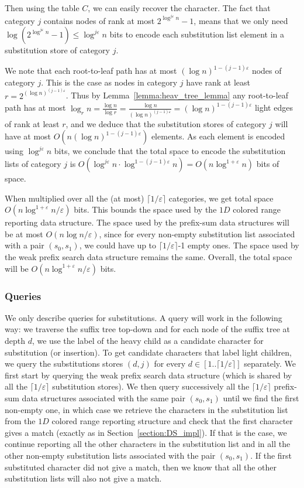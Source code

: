 \documentclass{article}
\newcommand{\?}{\mskip1.5mu}
\renewcommand{\epsilon}{\varepsilon}
\begin{document}
Then using the table $C$, we can easily recover the character. The fact that category $j$ contains nodes of rank at most $2^{\log^{j\epsilon} n}-1$, means that we only need $\log (2^{\log^{j\epsilon} n}-1)\leq \log^{j\epsilon} n$ bits to encode each substitution list element in a substitution store of category $j$. 

We note that each root-to-leaf path has at most $(\log n)^{1-(j-1)\epsilon}$ nodes of category $j$. This is the case as nodes in category $j$ have rank at least $r=2^{(\log n)^{(j-1)\epsilon}}$. Thus by Lemma~\ref{lemma:heav_tree_lemma} any root-to-leaf path has at most $\log_r n=\frac{\log n}{\log r}=\frac{\log n}{(\log n)^{(j-1)\epsilon}}=(\log n)^{1-(j-1)\epsilon}$ light edges of rank at least $r$, and we deduce that the substitution stores of category $j$ will have at most $O(n(\log n)^{1-(j-1)\epsilon})$ elements. As each element is encoded using $\log^{j\epsilon} n$ bits, we conclude that the total space to encode the substitution lists of category $j$ is $O(\log^{j\epsilon} n\cdot \log^{1-(j-1)\epsilon}n)=O(n\log^{1+\epsilon}n)$ bits of space.

When multiplied over all the (at most) $\lceil1/\epsilon\rceil$ categories, we get total space $O(n\log^{1+\epsilon}n/\epsilon)$ bits.
This bounds the space used by the $1D$ colored range reporting data structure. The space used by the prefix-sum data structures will be at most $O(n\log n/\epsilon)$, since for every non-empty substitution list associated with a pair $(s_0,s_1)$, we could have up to $\lceil 1/\epsilon\rceil$-1 empty ones. 
The space used by the weak prefix search data structure remains the same. 
Overall, the total space will be $O(n\log^{1+\epsilon}n/\epsilon)$ bits. 
\subsubsection{Queries}
We only describe queries for substitutions. A query will work in the following way: we traverse the suffix tree top-down and for each node of the suffix tree at depth $d$, we use the label of the heavy child as a candidate character for substitution (or insertion). 
To get candidate characters that label light children, we query the substitutions stores $(d,j)$ for every $d\in[1..\lceil1/\epsilon\rceil]$ separately. We first start by querying the weak prefix search data structure (which is shared by all the 
$\lceil1/\epsilon\rceil$ substitution stores). We then query successively all the $\lceil1/\epsilon\rceil$ prefix-sum data structures associated with the same pair $(s_0,s_1)$ until we find the first non-empty one, in which case we retrieve the characters in the substitution list from the $1D$ colored range reporting structure and check that the first character gives a match (exactly as in Section~\ref{section:DS_impl}). If that is the case, we continue reporting all the other characters in the substitution list and in all the other non-empty substitution lists associated with the pair $(s_0,s_1)$. If the first substituted character did not give a match, then we know that all the other substitution lists will also  not give a match. 
\end{document}
